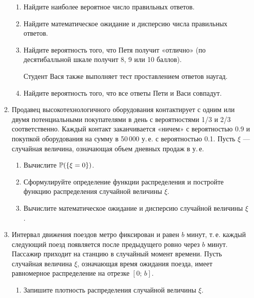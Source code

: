 \documentclass[12pt, a4paper]{article}\usepackage[]{graphicx}\usepackage[]{color}
\begin{document}
\begin{enumerate}
							\begin{enumerate}
								\item	Найдите наиболее вероятное число правильных ответов.

								\item	Найдите математическое ожидание и дисперсию числа правильных ответов.

								\item	Найдите вероятность того, что Петя получит «отлично» (по десятибалльной шкале получит 8, 9 или 10 баллов).

								Студент Вася также выполняет тест проставлением ответов наугад.

								\item	Найдите вероятность того, что все ответы Пети и Васи совпадут.
							\end{enumerate}

							\newpage
							\item  Продавец высокотехнологичного оборудования контактирует с одним или двумя потенциальными покупателями в день с вероятностями 1/3 и 2/3 соответственно. Каждый контакт заканчивается «ничем» с вероятностью 0.9 и покупкой оборудования на сумму в 50\,000 у.\,е. с вероятностью 0.1. Пусть $\xi$ — случайная величина, означающая объем дневных продаж в у.\,е.

							\begin{enumerate}
								\item	Вычислите  $\P(\{\xi = 0\})$.

								\item	Сформулируйте определение функции распределения и постройте функцию распределения случайной величины $\xi$.

								\item	Вычислите математическое ожидание и дисперсию случайной величины $\xi$.
							\end{enumerate}


							\item  Интервал движения поездов метро фиксирован и равен $b$ минут, т.\,е. каждый следующий поезд появляется после предыдущего ровно через $b$ минут. Пассажир приходит на станцию в случайный момент времени. Пусть случайная величина $\xi$, означающая время ожидания поезда, имеет равномерное распределение на отрезке $[0; \, b]$.

							\begin{enumerate}
								\item Запишите плотность распределения случайной величины $\xi$.


\end{enumerate}
\end{enumerate}
\end{document}
